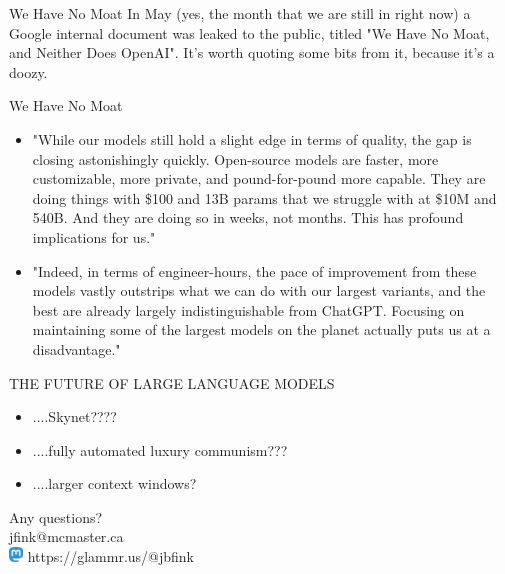 \documentclass{beamer}
\begin{document}



\begin{frame}{We Have No Moat}
	In May (yes, the month that we are still in right now) a Google internal document was leaked to the public, titled "We Have No Moat, and Neither Does OpenAI". It's worth quoting some bits from it, because it's a doozy.
\end{frame}

\begin{frame}{We Have No Moat}
	\begin{itemize}
		\item "While our models still hold a slight edge in terms of quality, the gap is closing astonishingly quickly. Open-source models are faster, more customizable, more private, and pound-for-pound more capable. They are doing things with \$100 and 13B params that we struggle with at \$10M and 540B. And they are doing so in weeks, not months. This has profound implications for us."
		\pause
		\item "Indeed, in terms of engineer-hours, the pace of improvement from these models vastly outstrips what we can do with our largest variants, and the best are already largely indistinguishable from ChatGPT. Focusing on maintaining some of the largest models on the planet actually puts us at a disadvantage."
	\end{itemize}
\end{frame}

\begin{frame}{THE FUTURE OF LARGE LANGUAGE MODELS}
	\begin{itemize}
		\item ....Skynet????
		\pause
		\item ....fully automated luxury communism???
		\pause 
		\item ....larger context windows?
		
	\end{itemize}
	
	
	
\end{frame}

\begin{frame}
	Any questions?\\ 
	jfink@mcmaster.ca\\
	\includegraphics[left, height=4mm]{mastodon} \hspace{1mm}  https://glammr.us/@jbfink
	
\end{frame}
\end{document}

